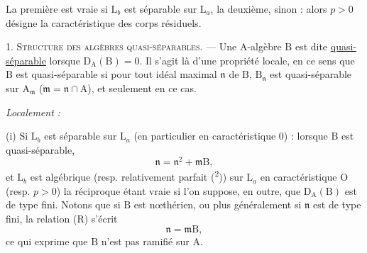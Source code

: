 La première est vraie si $\mathrm L_b$ est séparable sur $\mathrm L_a$, la deuxième, sinon : alors $p>0$ désigne la caractéristique des corps résiduels.

1. \textsc{Structure des algèbres quasi-séparables.} --- Une $\mathrm A$-algèbre $\mathrm B$ est dite \uline{quasi-séparable} lorsque $\mathrm D_{\mathrm A}(\mathrm B)=0$. Il s’agit là d’une propriété locale, en ce sens que $\mathrm B$ est quasi-séparable si pour tout idéal maximal $\mathfrak n$ de $\mathrm B$, $\mathrm B_{\mathfrak n}$ est quasi-séparable sur $\mathrm A_{\mathfrak m}$ ($\mathfrak m=\mathfrak n\cap\mathrm A$), et seulement en ce cas.

\textit{Localement :}

(i) Si $\mathrm L_b$ est séparable sur $\mathrm L_a$ (en particulier en caractéristique $0$) : lorsque $\mathrm B$ est quasi-séparable,
\[
\mathfrak n=\mathfrak n^2+\mathfrak m\mathrm B,\tag*{(R)}
\]
et $\mathrm L_b$ est algébrique (resp. relativement parfait (\textsuperscript{2})) sur $\mathrm L_a$ en caractéristique $\mathrm O$ (resp. $p>0$) la réciproque étant vraie si l’on suppose, en outre, que $\mathrm D_{\mathrm A}(\mathrm B)$ est de type fini. Notons que si $\mathrm B$ est nœthérien, ou plus généralement si $\mathfrak n$ est de type fini, la relation (R) s’écrit
\[
\mathfrak n=\mathfrak m\mathrm B,
\]
ce qui exprime que $\mathrm B$ n’est pas ramifié sur $\mathrm A$.
